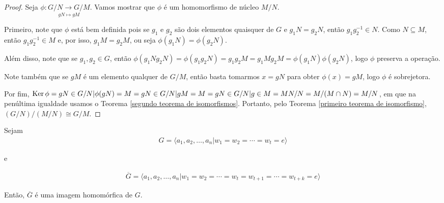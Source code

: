 	\begin{proof}
		Seja $\phi:\underset{gN\mapsto gM}{G/N\to G/M}$. Vamos mostrar que $\phi$ é um homomorfismo de núcleo $M/N$.
		\par\vspace{0.3cm}
		Primeiro, note que $\phi$ está bem definida pois se $g_1$ e $g_2$ são dois elementos quaisquer de $G$ e $g_1N=g_2N$, então $g_1g_2^{-1}\in N$. Como $N\subseteq M$, então $g_1g_2^{-1}\in M$ e, por isso, $g_1M=g_2M$, ou seja $\phi(g_1N)=\phi(g_2N)$.
		\par\vspace{0.3cm}
		Além disso, note que se $g_1,g_2\in G$, então $\phi(g_1Ng_2N)=\phi(g_1g_2N)=g_1g_2M=g_1Mg_2M=\phi(g_1N)\phi(g_2N)$, logo $\phi$ preserva a operação.
		\par\vspace{0.3cm}
		Note também que se $gM$ é um elemento qualquer de $G/M$, então basta tomarmos $x=gN$ para obter $\phi(x)=gM$, logo $\phi$ é sobrejetora.
		\par\vspace{0.3cm}
		Por fim,  $\operatorname{Ker}\phi={gN\in G/N|\phi(gN)=M}={gN\in G/N|gM=M}={gN\in G/N|g\in M}=MN/N=M/(M\cap N)=M/N$, em que na penúltima igualdade usamos o Teorema \eqref{segundo teorema de isomorfismos}. Portanto, pelo Teorema \eqref{primeiro teorema de isomorfismo}, $(G/N)/(M/N)\cong G/M$. 
	\end{proof}
	
	\par\vspace{0.3cm}
	
	\begin{theorem}
		\label{teorema de Dyck}
		Sejam \begin{align*}
		G = \langle a_1, a_2, \dots, a_n | w_1 = w_2 = \cdots = w_t = e \rangle
		\end{align*} 
		\begin{center}
			e
		\end{center} 
		\begin{align*}
		\overline{G} = \langle a_1, a_2, \dots, a_n | w_1 = w_2 = \cdots = w_t = w_{t+1} = \cdots = w_{t+k} = e \rangle
		\end{align*}
		
		\par\vspace{0.3cm} Então, $\overline{G}$ é uma imagem homomórfica de $G$.
		
	\end{theorem}
	
